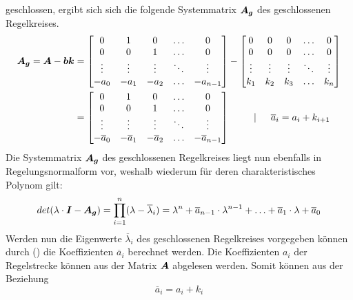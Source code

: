 geschlossen, ergibt sich sich die folgende Systemmatrix $\boldsymbol{A_g}$ des geschlossenen Regelkreises.
\begin{equation}
\begin{split}
\boldsymbol{A_g} = \boldsymbol{A}-\boldsymbol{b}\boldsymbol{k} &= \begin{bmatrix}
0 & 1 & 0 & \hdots & 0 \\
0 & 0 & 1 & \hdots & 0 \\
\vdots & \vdots & \vdots & \ddots & \vdots \\
-a_0 & -a_1 & -a_2 & \hdots & -a_{n-1}
\end{bmatrix}
-
\begin{bmatrix}
0 & 0 & 0 & \hdots & 0 \\
0 & 0 & 0 & \hdots & 0 \\
\vdots & \vdots & \vdots &  \ddots & \vdots \\
k_1 & k_2 & k_3 & \hdots & k_n
\end{bmatrix}
\\
&= \begin{bmatrix}
0 & 1 & 0 & \hdots & 0 \\
0 & 0 & 1 & \hdots & 0 \\
\vdots & \vdots & \vdots & \ddots & \vdots \\
-\overline{a}_0 & -\overline{a}_1 & -\overline{a}_2 & \hdots & -\overline{a}_{n-1}
\end{bmatrix}
\hspace{25pt} \vert \hspace{15pt} \overline{a}_i = a_i + k_{i+1}
\end{split}
\end{equation}
Die Systemmatrix $\boldsymbol{A_g}$ des geschlossenen Regelkreises liegt nun ebenfalls in Regelungsnormalform vor, weshalb wiederum für deren charakteristisches Polynom gilt:
\begin{equation}
det(\lambda\cdot \boldsymbol{I}-\boldsymbol{A_g}) = \prod^n_{i=1} (\lambda-\overline{\lambda}_i) = \lambda^n+\overline{a}_{n-1}\cdot \lambda^{n-1} + \hdots + \overline{a}_1\cdot \lambda + \overline{a}_0
\label{eq_ew_gRK}
\end{equation}
Werden nun die Eigenwerte $\overline{\lambda}_i$ des geschlossenen Regelkreises vorgegeben können durch (\cite{eq_ew_gRK}) die Koeffizienten $\overline{a}_i$ berechnet werden. Die Koeffizienten $a_i$ der Regelstrecke können aus der Matrix $\boldsymbol{A}$ abgelesen werden. Somit können aus der Beziehung
\begin{equation}
\overline{a}_i = a_i + k_i
\end{equation}
